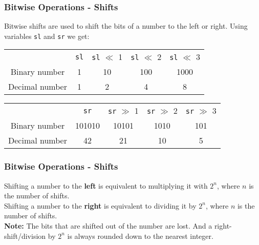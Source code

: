 \documentclass{beamer}
\begin{document}
\begin{frame}
  \frametitle{Bitwise Operations - Shifts}
  Bitwise shifts are used to shift the bits of a number to the left or right. Using variables \texttt{sl} and \texttt{sr} we get: \\
  \begin{table}
    \centering
    \begin{tabular}{cc|c|c|c}
    &\texttt{sl} & \texttt{sl} $\ll$ 1 & \texttt{sl} $\ll$ 2 & \texttt{sl} $\ll$ 3 \\
    \cline{2-5}
    Binary number &1 & 10 & 100 & 1000 \\
    Decimal number &1 & 2 & 4 & 8 \\
    \end{tabular}
  \end{table}
  \begin{table}
    \centering
    \begin{tabular}{cc|c|c|c}
    &\texttt{sr} & \texttt{sr} $\gg$ 1 & \texttt{sr} $\gg$ 2 & \texttt{sr} $\gg$ 3 \\
    \cline{2-5}
    Binary number  &101010 & 10101 & 1010 & 101 \\
    Decimal number &42 & 21 & 10 & 5 \\
    \end{tabular}
  \end{table}
\end{frame}
\begin{frame}
  \frametitle{Bitwise Operations - Shifts}
  Shifting a number to the \textbf{left} is equivalent to multiplying it with $2^n$, where $n$ is the number of shifts.\\ 
  \vspace{5mm}
  Shifting a number to the \textbf{right} is equivalent to dividing it by $2^n$, where $n$ is the number of shifts.\\
  \vspace{5mm}
  \textbf{Note: } The bits that are shifted out of the number are lost. And a right-shift/division by $2^n$ is always rounded down to the nearest integer.\\

  

\end{frame}
\end{document}
